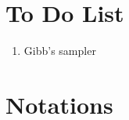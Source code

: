 \documentclass[preprint,12pt]{elsarticle}
\begin{document}
\begin{frontmatter}





\end{frontmatter}

\linenumbers
\section{To Do List}
\begin{enumerate}
    \item Gibb's sampler
\end{enumerate}
\section{Notations}
\printunsrtglossary[type=symbols,style=long, title = {List of Notations}]
\end{document}
